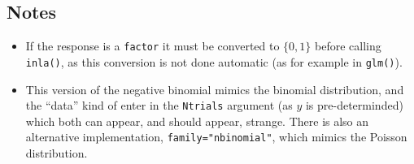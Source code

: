 \documentclass[a4paper,11pt]{article}
\begin{document}
\subsection*{Notes}

\begin{itemize}
\item If the response is a \verb|factor| it must be converted to
    $\{0,1\}$ before calling \verb|inla()|, as this conversion is not
    done automatic (as for example in \verb|glm()|).
\item This version of the negative binomial mimics the binomial
    distribution, and the ``data'' kind of enter in the
    \texttt{Ntrials} argument (as $y$ is pre-determinded) which both
    can appear, and should appear, strange. There is also an
    alternative implementation, \texttt{family="nbinomial"}, which
    mimics the Poisson distribution.
\end{itemize}
\end{document}
